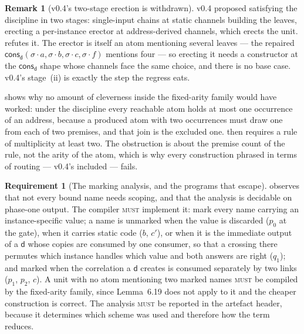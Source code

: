 \documentclass[11pt,a4paper]{article}
\newcommand{\MUST}{\textsc{must}}
\newcommand{\dd}{\mathsf{d}}
\newcommand{\cons}{\mathsf{cons}}
\theoremstyle{definition}
\newtheorem{requirement}[definition]{Requirement}
\newtheorem{remark}[definition]{Remark}
\theoremstyle{plain}
\begin{document}
\begin{remark}[v0.4's two-stage erection is withdrawn]\label{rem:twostagegone}
v0.4 proposed satisfying the discipline in two stages: single-input chains at
static channels building the leaves, erecting a per-instance erector at
address-derived channels, which erects the unit. \cite[\S6.6]{draft3} refutes
it. The erector is itself an atom mentioning several leaves --- the repaired
$\cons_{\dd}(\sigma\!\cdot\!a,\sigma\!\cdot\!b,\sigma\!\cdot\!c,
\sigma\!\cdot\!f)$ mentions four --- so erecting it needs a constructor at the
$\cons_{\dd}$ shape whose channels face the same choice, and there is no base
case. v0.4's stage~(ii) is exactly the step the regress eats.

\cite[Prop.~6.17]{draft3} shows why no amount of cleverness inside the
fixed-arity family would have worked: under the discipline every reachable
atom holds at most one occurrence of an address, because a produced atom with
two occurrences must draw one from each of two premises, and that join is the
excluded one. \cite[Lem.~6.19]{draft3} then requires a rule of multiplicity at
least two. The obstruction is about the premise count of the rule, not the
arity of the atom, which is why every construction phrased in terms of routing
--- v0.4's included --- fails.
\end{remark}

\begin{requirement}[The marking analysis, and the programs that escape]
\label{req:marking}
\cite[Rem.~6.20]{draft3} observes that not every bound name needs scoping, and
that the analysis is decidable on phase-one output. The compiler \MUST{}
implement it: mark every name carrying an instance-specific value; a name is
unmarked when the value is discarded ($p_{0}$ at the gate), when it carries
static code ($b$, $c'$), or when it is the immediate output of a $\dd$ whose
copies are consumed by one consumer, so that a crossing there permutes which
instance handles which value and both answers are right ($q_{1}$); and marked
when the correlation a $\dd$ creates is consumed separately by two links
($p_{1}$, $p_{2}$, $c$). A unit with no atom mentioning two marked names
\MUST{} be compiled by the fixed-arity family, since
Lemma~6.19 does not apply to it and the cheaper construction is correct. The
analysis \MUST{} be reported in the artefact header, because it determines
which scheme was used and therefore how the term reduces.
\end{requirement}
\end{document}
